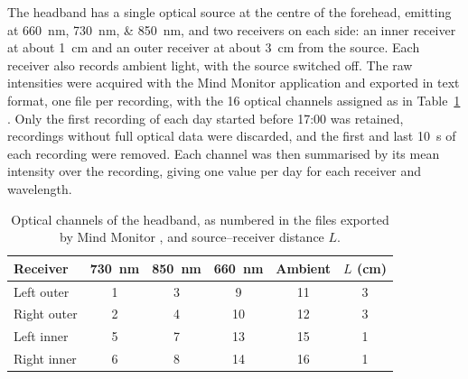 \documentclass[11pt,a4paper]{article}
\begin{document}
The headband has a single optical source at the centre of the forehead, emitting at
\SIlist{660;730;850}{\nano\metre}, and two receivers on each side: an inner receiver at
about \SI{1}{\centi\metre} and an outer receiver at about \SI{3}{\centi\metre} from the
source. Each receiver also records ambient light, with the source switched off. The raw
intensities were acquired with the Mind Monitor application and exported in text
format, one file per recording, with the 16 optical channels assigned as in
Table~\ref{tab:optics} \citep{clutterbuck_mindmonitor}. Only the first recording of each
day started before 17:00 was retained, recordings without full optical data were discarded,
and the first and last \SI{10}{\second} of each recording were removed. Each channel
was then summarised by its mean intensity over the recording, giving one value per day
for each receiver and wavelength.

\begin{table}[htbp]
  \centering
  \caption{Optical channels of the headband, as numbered in the files exported by Mind
    Monitor \citep{clutterbuck_mindmonitor}, and source--receiver distance $L$.}
  \label{tab:optics}
  \begin{tabular}{lccccc}
    \toprule
    Receiver & \SI{730}{\nano\metre} & \SI{850}{\nano\metre} & \SI{660}{\nano\metre} & Ambient & $L$ (\si{\centi\metre}) \\
    \midrule
    Left outer  & 1 & 3 &  9 & 11 & 3 \\
    Right outer & 2 & 4 & 10 & 12 & 3 \\
    Left inner  & 5 & 7 & 13 & 15 & 1 \\
    Right inner & 6 & 8 & 14 & 16 & 1 \\
    \bottomrule
  \end{tabular}
\end{table}
\end{document}
